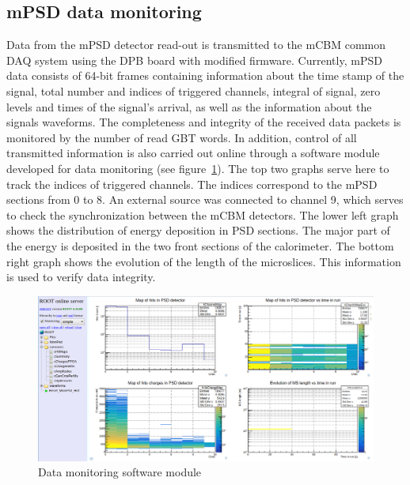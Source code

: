 \documentclass[a4paper,11pt]{article}
\begin{document}
\subsection{mPSD data monitoring}
Data from the mPSD detector read-out is transmitted to the mCBM common DAQ system using the DPB board with modified firmware. Currently, mPSD data consists of 64-bit frames containing information about the time stamp of the signal, total number and indices of triggered channels, integral of signal, zero levels and times of the signal's arrival, as well as the information about the signals waveforms.
The completeness and integrity of the received data packets is monitored by the number of read GBT words. In addition, control of all transmitted information is also carried out online through a software module developed for data monitoring (see figure~\ref{fig:5}). The top two graphs serve here to track the indices of triggered channels. The indices correspond to the mPSD sections from 0 to 8. An external source was connected to channel 9, which serves to check the synchronization between the mCBM detectors. The lower left graph shows the distribution of energy deposition in PSD sections. The major part of the energy is deposited in the two front sections of the calorimeter. The bottom right graph shows the evolution of the length of the microslices. This information is used to verify data integrity.

\begin{figure}[htbp]
\centering %
\includegraphics[width=\textwidth]{run582.png}
\caption{\label{fig:5} Data monitoring software module}
\end{figure}
\end{document}
